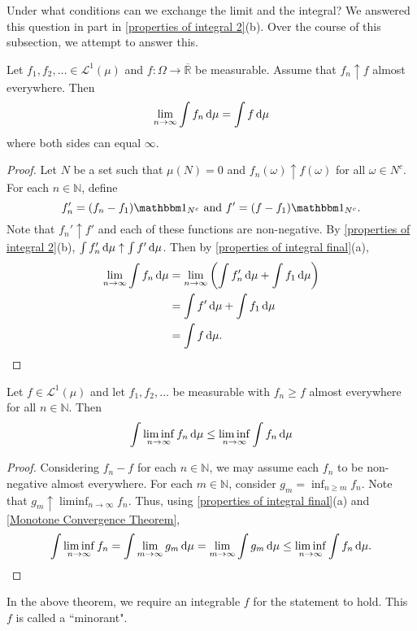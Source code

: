 Under what conditions can we exchange the limit and the integral? We answered this question in part in \cref{properties of integral 2}(b). Over the course of this subsection, we attempt to answer this.

\begin{ftheo}
\label{Monotone Convergence Theorem}
Let $f_1,f_2,\ldots\in\mathcal{L}^1(\mu)$ and $f:\Omega\to\overline{\mathbb{R}}$ be measurable. Assume that $f_n\uparrow f$ almost everywhere. Then
$$\lim_{n\to\infty}\int f_n\operatorname{d}\!{\mu} = \int f\operatorname{d}\!{\mu}$$
where both sides can equal $\infty$.
\end{ftheo}
\begin{proof}
    Let $N$ be a set such that $\mu(N)=0$ and $f_n(\omega)\uparrow f(\omega)$ for all $\omega\in N^c$. For each $n\in\mathbb{N}$, define
    $$f_n'=(f_n-f_1)\indic_{N^c}\text{ and }f'=(f-f_1)\indic_{N^c}.$$
    Note that $f_n'\uparrow f'$ and each of these functions are non-negative. By \cref{properties of integral 2}(b), $\int f_n'\operatorname{d}\!{\mu}\uparrow\int f'\operatorname{d}\!{\mu}$. Then by \cref{properties of integral final}(a),
    \begin{align*}
        \lim_{n\to\infty} \int f_n\operatorname{d}\!{\mu} &= \lim_{n\to\infty}\left(\int f_n'\operatorname{d}\!{\mu} + \int f_1\operatorname{d}\!{\mu}\right) \\
        &= \int f'\operatorname{d}\!{\mu} + \int f_1\operatorname{d}\!{\mu} \\
        &= \int f\operatorname{d}\!{\mu}.
    \end{align*}
\end{proof}

\begin{ftheo}
\label{fatous lemma}
    Let $f\in\mathcal{L}^1(\mu)$ and let $f_1,f_2,\ldots$ be measurable with $f_n\geq f$ almost everywhere for all $n\in\mathbb{N}$. Then
    $$\int \liminf_{n\to\infty} f_n\operatorname{d}\!{\mu} \leq \liminf_{n\to \infty} \int f_n\operatorname{d}\!{\mu}$$
\end{ftheo}
\begin{proof}
    Considering $f_n-f$ for each $n\in\mathbb{N}$, we may assume each $f_n$ to be non-negative almost everywhere. For each $m\in\mathbb{N}$, consider $g_m=\inf_{n\geq m}f_n$. Note that $g_m\uparrow \liminf_{n\to\infty} f_n$. Thus, using \cref{properties of integral final}(a) and \cref{Monotone Convergence Theorem},
    $$\int \liminf_{n\to\infty} f_n = \int \lim_{m\to\infty} g_m\operatorname{d}\!{\mu} = \lim_{m\to\infty}\int g_m\operatorname{d}\!{\mu} \leq \liminf_{n\to\infty}\int f_n\operatorname{d}\!{\mu}.$$
\end{proof}

In the above theorem, we require an integrable $f$ for the statement to hold. This $f$ is called a ``minorant".

